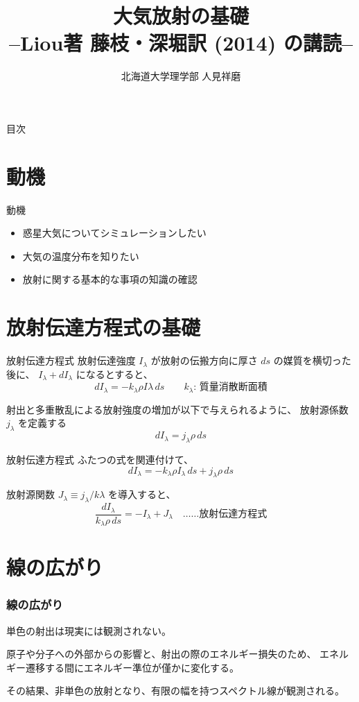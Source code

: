 \documentclass[unicode,colorlinks]{beamer}
\title{大気放射の基礎\\--Liou著 藤枝・深堀訳 (2014) の講読--}
\author{北海道大学理学部 人見祥磨}
\date{\warekitoday}
\begin{document}
\maketitle
\mleftright

\begin{frame}{目次}
	\tableofcontents
\end{frame}

\section{動機}

\begin{frame}{動機}
	\begin{itemize}
		\item 惑星大気についてシミュレーションしたい
		\item 大気の温度分布を知りたい
		\item 放射に関する基本的な事項の知識の確認
	\end{itemize}
\end{frame}

\section{放射伝達方程式の基礎}

\begin{frame}{放射伝達方程式}
	放射伝達強度 $I_\lambda$ が放射の伝搬方向に厚さ $ds$ の媒質を横切った後に、
	$I_\lambda+dI_\lambda$ になるとすると、
	\[dI_\lambda=-k_\lambda\rho I\lambda\,ds\qquad\text{$k_\lambda$: 質量消散断面積}\]

	射出と多重散乱による放射強度の増加が以下で与えられるように、
	放射源係数 $j_\lambda$ を定義する
	\[dI_\lambda=j_\lambda\rho\,ds\]
\end{frame}

\begin{frame}{放射伝達方程式}
	ふたつの式を関連付けて、
	\[dI_\lambda=-k_\lambda\rho I_\lambda\,ds+j_\lambda\rho\,ds\]

	放射源関数 $J_\lambda\equiv j_\lambda/k\lambda$ を導入すると、
	\[\frac{dI_\lambda}{k_\lambda\rho\,ds}=-I_\lambda+J_\lambda\quad\text{……放射伝達方程式}\]
\end{frame}

\section{線の広がり}

\begin{frame}
	\frametitle{線の広がり}
	単色の射出は現実には観測されない。

	原子や分子への外部からの影響と、射出の際のエネルギー損失のため、
	エネルギー遷移する間にエネルギー準位が僅かに変化する。

	その結果、非単色の放射となり、有限の幅を持つスペクトル線が観測される。
\end{frame}
\end{document}
